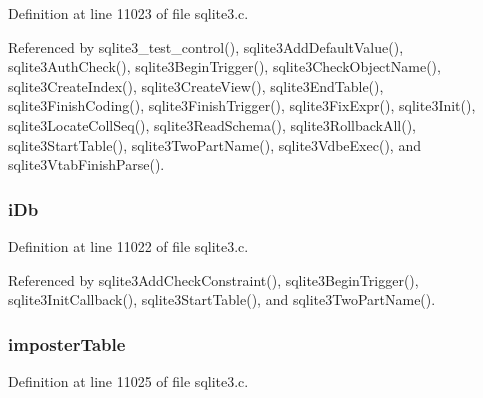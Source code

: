 Definition at line 11023 of file sqlite3.\+c.



Referenced by sqlite3\+\_\+test\+\_\+control(), sqlite3\+Add\+Default\+Value(), sqlite3\+Auth\+Check(), sqlite3\+Begin\+Trigger(), sqlite3\+Check\+Object\+Name(), sqlite3\+Create\+Index(), sqlite3\+Create\+View(), sqlite3\+End\+Table(), sqlite3\+Finish\+Coding(), sqlite3\+Finish\+Trigger(), sqlite3\+Fix\+Expr(), sqlite3\+Init(), sqlite3\+Locate\+Coll\+Seq(), sqlite3\+Read\+Schema(), sqlite3\+Rollback\+All(), sqlite3\+Start\+Table(), sqlite3\+Two\+Part\+Name(), sqlite3\+Vdbe\+Exec(), and sqlite3\+Vtab\+Finish\+Parse().

\hypertarget{structsqlite3_1_1sqlite3_init_info_ad97383a37c115dd7fe5abb5aa420e738}{}
\subsubsection[{i\+Db}]{ i\+Db}\label{structsqlite3_1_1sqlite3_init_info_ad97383a37c115dd7fe5abb5aa420e738}


Definition at line 11022 of file sqlite3.\+c.



Referenced by sqlite3\+Add\+Check\+Constraint(), sqlite3\+Begin\+Trigger(), sqlite3\+Init\+Callback(), sqlite3\+Start\+Table(), and sqlite3\+Two\+Part\+Name().

\hypertarget{structsqlite3_1_1sqlite3_init_info_a4a0d74dc228071d15bce855b20ef6b98}{}
\subsubsection[{imposter\+Table}]{ imposter\+Table}\label{structsqlite3_1_1sqlite3_init_info_a4a0d74dc228071d15bce855b20ef6b98}


Definition at line 11025 of file sqlite3.\+c.

\hypertarget{structsqlite3_1_1sqlite3_init_info_ab306156f4199316ebe4010f3842af971}{}

